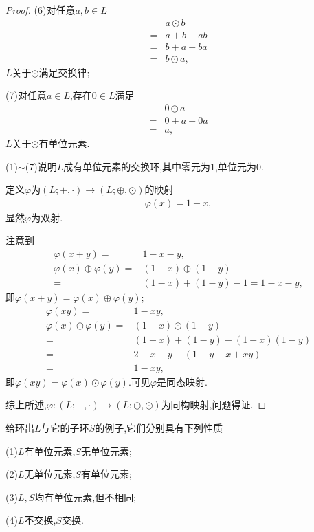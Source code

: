 \begin{proof}
    (6)对任意$a,b\in L$\begin{align*}
        &a\odot b\\
        =&a+b-ab\\
        =&b+a-ba\\
        =&b\odot a,
    \end{align*}$L$关于$\odot$满足交换律;

    (7)对任意$a\in L$,存在$0\in L$满足\begin{align*}
        &0\odot a\\
        =&0+a-0a\\
        =&a,
    \end{align*}$L$关于$\odot$有单位元素.

    (1)$\sim$(7)说明$L$成有单位元素的交换环,其中零元为$1$,单位元为$0$.

    定义$\varphi$为$(L;+,\cdot)\to(L;\oplus,\odot)$的映射\begin{align*}
        \varphi(x)=1-x,
    \end{align*}显然$\varphi$为双射.

    注意到\begin{align*}
        \varphi(x+y)=&1-x-y,\\
        \varphi(x)\oplus\varphi(y)=&(1-x)\oplus(1-y)\\
        =&(1-x)+(1-y)-1=1-x-y,
    \end{align*}即$\varphi(x+y)=\varphi(x)\oplus\varphi(y)$;\begin{align*}
        \varphi(xy)=&1-xy,\\
        \varphi(x)\odot\varphi(y)=&(1-x)\odot(1-y)\\
        =&(1-x)+(1-y)-(1-x)(1-y)\\
        =&2-x-y-(1-y-x+xy)\\
        =&1-xy,
    \end{align*}即$\varphi(xy)=\varphi(x)\odot\varphi(y)$.可见$\varphi$是同态映射.

    综上所述,$\varphi:(L;+,\cdot)\to(L;\oplus,\odot)$为同构映射,问题得证.
\end{proof}
\begin{problem}[P56T30]
    给环出$L$与它的子环$S$的例子,它们分别具有下列性质

    (1)$L$有单位元素,$S$无单位元素;

    (2)$L$无单位元素,$S$有单位元素;

    (3)$L,S$均有单位元素,但不相同;

    (4)$L$不交换,$S$交换.
\end{problem}
